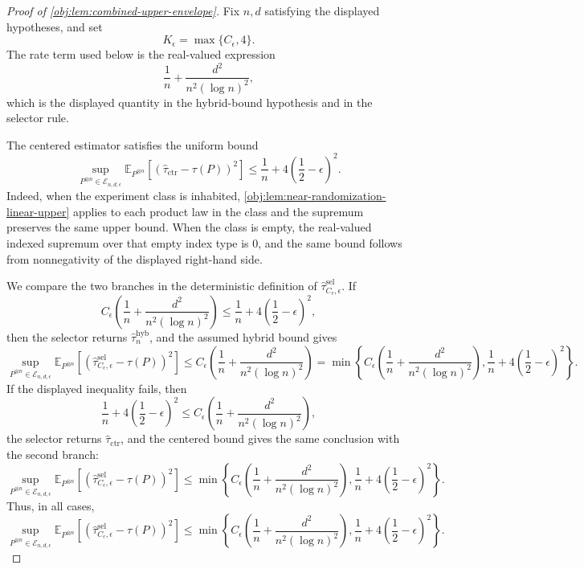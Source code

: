 \begin{proof}[Proof of \cref{obj:lem:combined-upper-envelope}]
Fix \(n,d\) satisfying the displayed hypotheses, and set
\[
K_\epsilon=\max\{C_\epsilon,4\}.
\]
The rate term used below is the real-valued expression
\[
\frac1n+\frac{d^2}{n^2(\log n)^2},
\]
which is the displayed quantity in the hybrid-bound hypothesis and in the selector rule.

The centered estimator satisfies the uniform bound
\[
\sup_{P^{\otimes n}\in\mathcal E_{n,d,\epsilon}}
\mathbb E_{P^{\otimes n}}\!\left[
(\widehat\tau_{\mathrm{ctr}}-\tau(P))^2
\right]
\le \frac1n+4\left(\frac12-\epsilon\right)^2.
\]
Indeed, when the experiment class is inhabited, \cref{obj:lem:near-randomization-linear-upper} applies to each product law in the class and the supremum preserves the same upper bound. When the class is empty, the real-valued indexed supremum over that empty index type is \(0\), and the same bound follows from nonnegativity of the displayed right-hand side. %

We compare the two branches in the deterministic definition of \(\widehat\tau^{\mathrm{sel}}_{C_\epsilon,\epsilon}\). If
\[
C_\epsilon\left(\frac1n+\frac{d^2}{n^2(\log n)^2}\right)
\le
\frac1n+4\left(\frac12-\epsilon\right)^2,
\]
then the selector returns \(\widehat\tau_n^{\mathrm{hyb}}\), and the assumed hybrid bound gives
\[
\sup_{P^{\otimes n}\in\mathcal E_{n,d,\epsilon}}
\mathbb E_{P^{\otimes n}}\!\left[
(\widehat\tau^{\mathrm{sel}}_{C_\epsilon,\epsilon}-\tau(P))^2
\right]
\le
C_\epsilon\left(\frac1n+\frac{d^2}{n^2(\log n)^2}\right)
=
\min\!\left\{
C_\epsilon\left(\frac1n+\frac{d^2}{n^2(\log n)^2}\right),
\frac1n+4\left(\frac12-\epsilon\right)^2
\right\}.
\]
If the displayed inequality fails, then
\[
\frac1n+4\left(\frac12-\epsilon\right)^2
\le
C_\epsilon\left(\frac1n+\frac{d^2}{n^2(\log n)^2}\right),
\]
the selector returns \(\widehat\tau_{\mathrm{ctr}}\), and the centered bound gives the same conclusion with the second branch:
\[
\sup_{P^{\otimes n}\in\mathcal E_{n,d,\epsilon}}
\mathbb E_{P^{\otimes n}}\!\left[
(\widehat\tau^{\mathrm{sel}}_{C_\epsilon,\epsilon}-\tau(P))^2
\right]
\le
\min\!\left\{
C_\epsilon\left(\frac1n+\frac{d^2}{n^2(\log n)^2}\right),
\frac1n+4\left(\frac12-\epsilon\right)^2
\right\}.
\]
Thus, in all cases,
\[
\sup_{P^{\otimes n}\in\mathcal E_{n,d,\epsilon}}
\mathbb E_{P^{\otimes n}}\!\left[
(\widehat\tau^{\mathrm{sel}}_{C_\epsilon,\epsilon}-\tau(P))^2
\right]
\le
\min\!\left\{
C_\epsilon\left(\frac1n+\frac{d^2}{n^2(\log n)^2}\right),
\frac1n+4\left(\frac12-\epsilon\right)^2
\right\}. %
\]


\end{proof}
